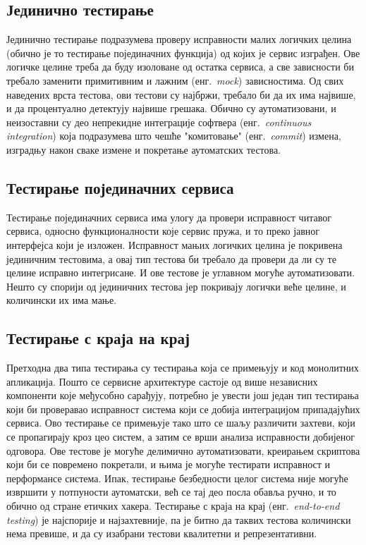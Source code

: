 \documentclass[12pt,oneside]{memoir}
\begin{document}
\subsection{Јединично тестирање}
Јединично тестирање подразумева проверу исправности малих логичких целина (обично је то тестирање појединачних функција) од којих је сервис изграђен. Ове логичке целине треба да буду изоловане од остатка сервиса, а све зависности би требало заменити примитивним и лажним (енг.~\textit{mock}) зависностима. Од свих наведених врста тестова, ови тестови су најбржи, требало би да их има највише, и да процентуално детектују највише грешака. Обично су аутоматизовани, и неизоставни су део непрекидне интеграције софтвера (енг.~\textit{continuous integration}) која подразумева што чешће "комитовање" (енг.~\textit{commit}) измена, изградњу након сваке измене и покретање аутоматских тестова.

\subsection{Тестирање појединачних сервиса}
Тестирање појединачних сервиса има улогу да провери исправност читавог сервиса, односно функционалности које сервис пружа, и то преко јавног интерфејса који је изложен. Исправност мањих логичких целина је покривена јединичним тестовима, а овај тип тестова би требало да провери да ли су те целине исправно интегрисане. И ове тестове је углавном могуће аутоматизовати. Нешто су спорији од јединичних тестова јер покривају логички веће целине, и количински их има мање.

\subsection{Тестирање с краја на крај}
Претходна два типа тестирања су тестирања која се примењују и код монолитних апликација. Пошто се сервисне архитектуре састоје од више независних компоненти које међусобно сарађују, потребно је увести још један тип тестирања који би проверавао исправност система који се добија интеграцијом припадајућих сервиса. Ово тестирање се примењује тако што се шаљу различити захтеви, који се пропагирају кроз цео систем, а затим се врши анализа исправности добијеног одговора. Ове тестове је могуће делимично аутоматизовати, креирањем скриптова који би се повремено покретали, и њима је могуће тестирати исправност и перформансе система. Ипак, тестирање безбедности целог система није могуће извршити у потпуности аутоматски, већ се тај део посла обавља ручно, и то обично од стране етичких хакера. Тестирање с краја на крај (енг.~\textit{end-to-end testing}) је најспорије и најзахтевније, па је битно да таквих тестова количински нема превише, и да су изабрани тестови квалитетни и репрезентативни.
\end{document}
